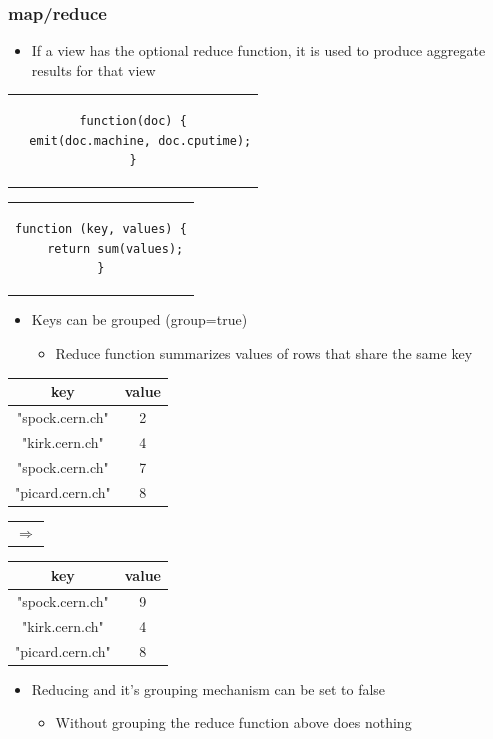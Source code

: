 \documentclass{beamer}
\begin{document}
\begin{frame}[t, fragile]
\frametitle{map/reduce}
\begin{itemize}
\item If a view has the optional reduce function, it is used to produce aggregate results for that view
\end{itemize}
{ \tiny
\begin{center}
\begin{tabular}{c}
\begin{lstlisting}
function(doc) {
  emit(doc.machine, doc.cputime);
}
\end{lstlisting}
\end{tabular}
\begin{tabular}{c}
\begin{lstlisting}
function (key, values) {
    return sum(values);
}
\end{lstlisting}
\end{tabular}
\end{center}
\begin{itemize}
\normalsize \item Keys can be grouped (group=true)
\begin{itemize}
	\item Reduce function summarizes values of rows that share the same key
\end{itemize}
\end{itemize}
\begin{center}
\begin{tabular}{|c|c|}
	\hline
	\textbf{key} & \textbf{value} \\
	\hline
	\hline
	"spock.cern.ch" & 2 \\
	\hline
	"kirk.cern.ch" & 4 \\
	\hline
	"spock.cern.ch" & 7 \\
	\hline
	"picard.cern.ch" & 8 \\
	\hline
\end{tabular}
\begin{tabular}{c}
	$\Longrightarrow$ \\
\end{tabular}
\begin{tabular}{|c|c|}
	\hline
	\textbf{key} & \textbf{value} \\
	\hline
	\hline
	"spock.cern.ch" & 9 \\
	\hline
	"kirk.cern.ch" & 4 \\
	\hline
	"picard.cern.ch" & 8 \\
	\hline
\end{tabular}
\end{center}
}
\begin{itemize}
\item Reducing and it's grouping mechanism can be set to false
\begin{itemize}
	\item Without grouping the reduce function above does nothing
\end{itemize}
\end{itemize}
\end{frame}
\end{document}

